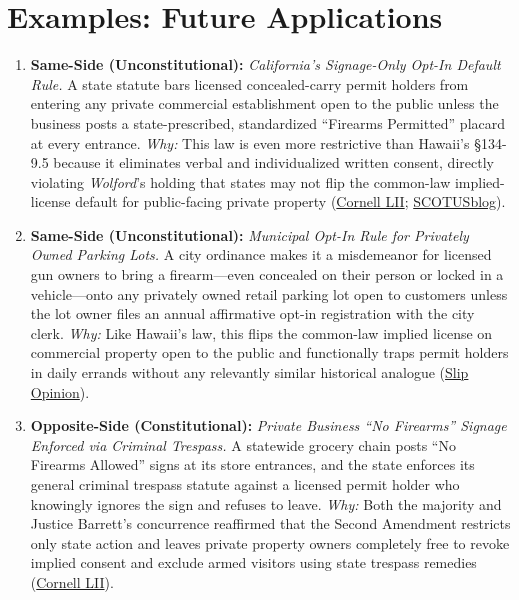 \documentclass[12pt]{article}
\begin{document}
\section{Examples: Future Applications}
\begin{enumerate}
\item \textbf{Same-Side (Unconstitutional):} \textit{California's Signage-Only Opt-In Default Rule.} A state statute bars licensed concealed-carry permit holders from entering any private commercial establishment open to the public unless the business posts a state-prescribed, standardized ``Firearms Permitted'' placard at every entrance. \textit{Why:} This law is even more restrictive than Hawaii's \S{}134-9.5 because it eliminates verbal and individualized written consent, directly violating \textit{Wolford}'s holding that states may not flip the common-law implied-license default for public-facing private property (\href{https://www.law.cornell.edu/supremecourt/text/24-1046}{Cornell LII}; \href{https://www.scotusblog.com/2026/06/supreme-court-strikes-hawaii-gun-restriction/}{SCOTUSblog}).

\item \textbf{Same-Side (Unconstitutional):} \textit{Municipal Opt-In Rule for Privately Owned Parking Lots.} A city ordinance makes it a misdemeanor for licensed gun owners to bring a firearm---even concealed on their person or locked in a vehicle---onto any privately owned retail parking lot open to customers unless the lot owner files an annual affirmative opt-in registration with the city clerk. \textit{Why:} Like Hawaii's law, this flips the common-law implied license on commercial property open to the public and functionally traps permit holders in daily errands without any relevantly similar historical analogue (\href{https://www.supremecourt.gov/opinions/25pdf/24-1046_nmio.pdf}{Slip Opinion}).

\item \textbf{Opposite-Side (Constitutional):} \textit{Private Business ``No Firearms'' Signage Enforced via Criminal Trespass.} A statewide grocery chain posts ``No Firearms Allowed'' signs at its store entrances, and the state enforces its general criminal trespass statute against a licensed permit holder who knowingly ignores the sign and refuses to leave. \textit{Why:} Both the majority and Justice Barrett's concurrence reaffirmed that the Second Amendment restricts only state action and leaves private property owners completely free to revoke implied consent and exclude armed visitors using state trespass remedies (\href{https://www.law.cornell.edu/supremecourt/text/24-1046}{Cornell LII}).


\end{enumerate}
\end{document}
